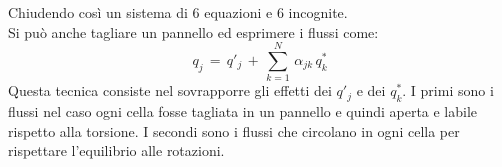 \begin{esempioBox}
Chiudendo così un sistema di 6 equazioni e 6 incognite.\\
Si può anche tagliare un pannello ed esprimere i flussi come:
\begin{equation*}
    q_j\,=\,q'_j\,+\,   \sum^N_{k=1}\,\alpha_{jk}\,q^*_k
\end{equation*}
Questa tecnica consiste nel sovrapporre gli effetti dei $q'_j$ e dei $q^*_k$. I primi sono i flussi nel caso ogni cella fosse tagliata in un pannello e quindi aperta e labile rispetto alla torsione. I secondi sono i flussi che circolano in ogni cella per rispettare l'equilibrio alle rotazioni.


    
\end{esempioBox}


